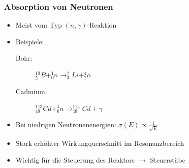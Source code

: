 \documentclass{beamer}[9pt]
\begin{document}
\begin{frame}
\frametitle{Absorption von Neutronen}
\begin{itemize}
\item Meist vom Typ $(n,\gamma)$-Reaktion
\item Beispiele:
\begin{description}
\item[Bohr:] $^{10}_5B + ^1_0n \rightarrow ^{7}_3Li + ^4_2\alpha$
\vspace{0.2cm}
\item[Cadmium:] $^{113}_{48}Cd + ^1_0n \rightarrow ^{114}_{48}Cd + \gamma$
\end{description}
\vspace{0.2cm}
\item Bei niedrigen Neutronenenergien: $\sigma(E) \propto  \frac{1}{\sqrt{E}}$
\item Stark erhöhter Wirkungquerschnitt im Resonanzbereich
\item Wichtig für die Steuerung des Reaktors $\rightarrow$ Steuerstäbe
\end{itemize}
\end{frame}
\end{document}
